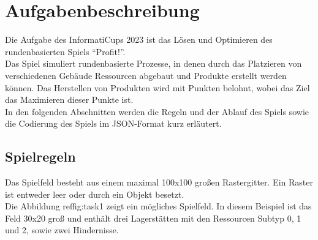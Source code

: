 \section{Aufgabenbeschreibung}\label{cap:aufgabenbeschriebung}
Die Aufgabe des InformatiCups 2023 ist das Lösen und Optimieren des rundenbasierten Spiels “Profit!”. 
\\
Das Spiel simuliert rundenbasierte Prozesse, in denen durch das Platzieren von verschiedenen Gebäude Ressourcen abgebaut und Produkte erstellt werden können. Das Herstellen von Produkten wird mit Punkten belohnt, wobei das Ziel das Maximieren dieser Punkte ist.
\\
In den folgenden Abschnitten werden die Regeln und der Ablauf des Spiels sowie die Codierung des Spiels im JSON-Format kurz erläutert.

\subsection{Spielregeln}
Das Spielfeld besteht aus einem maximal 100x100 großen Rastergitter. Ein Raster ist entweder leer oder durch ein Objekt besetzt.
\\
Die Abbildung ref{fig:task1} zeigt ein mögliches Spielfeld. In diesem Beispiel ist das Feld 30x20 groß und enthält drei Lagerstätten mit den Ressourcen Subtyp 0, 1 und 2, sowie zwei Hindernisse.

